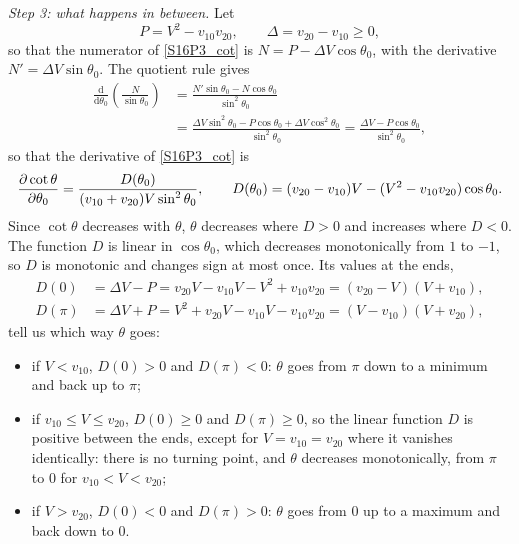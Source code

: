 \begin{problem}[title={Range of angles between two decay products}]
{\textit{Step 3: what happens in between.} Let
\begin{equation*}
    P = V^2-v_{10}v_{20}, \qquad \Delta = v_{20}-v_{10} \geq 0,
\end{equation*}
so that the numerator of \eqref{S16P3_cot} is $N = P - \Delta V\cos{\theta_0}$, with the derivative $N' = \Delta V\sin{\theta_0}$. The quotient rule gives
\begin{align*}
    \frac{\mathrm{d}}{\mathrm{d}\theta_0}\left(\frac{N}{\sin{\theta_0}}\right) &= \frac{N'\sin{\theta_0} - N\cos{\theta_0}}{\sin^2{\theta_0}} \\
    &= \frac{\Delta V\sin^2{\theta_0} - P\cos{\theta_0} + \Delta V\cos^2{\theta_0}}{\sin^2{\theta_0}} = \frac{\Delta V - P\cos{\theta_0}}{\sin^2{\theta_0}},
\end{align*}
so that the derivative of \eqref{S16P3_cot} is
\begin{equation*}
    \frac{\partial \cot{\theta}}{\partial \theta_0} = \frac{D(\theta_0)}{(v_{10}+v_{20})V\sin^2{\theta_0}}, \qquad
    D(\theta_0) = (v_{20}-v_{10})V - (V^2-v_{10}v_{20})\cos{\theta_0}.
\end{equation*}
Since $\cot{\theta}$ decreases with $\theta$, $\theta$ decreases where $D>0$ and increases where $D<0$. The function $D$ is linear in $\cos{\theta_0}$, which decreases monotonically from $1$ to $-1$, so $D$ is monotonic and changes sign at most once. Its values at the ends,
\begin{align*}
    D(0) &= \Delta V - P = v_{20}V - v_{10}V - V^2 + v_{10}v_{20} = (v_{20}-V)(V+v_{10}), \\
    D(\pi) &= \Delta V + P = V^2 + v_{20}V - v_{10}V - v_{10}v_{20} = (V-v_{10})(V+v_{20}),
\end{align*}
tell us which way $\theta$ goes:
\begin{itemize}
    \item if $V<v_{10}$, $D(0)>0$ and $D(\pi)<0$: $\theta$ goes from $\pi$ down to a minimum and back up to $\pi$;
    \item if $v_{10} \leq V \leq v_{20}$, $D(0) \geq 0$ and $D(\pi) \geq 0$, so the linear function $D$ is positive between the ends, except for $V = v_{10} = v_{20}$ where it vanishes identically: there is no turning point, and $\theta$ decreases monotonically, from $\pi$ to $0$ for $v_{10}<V<v_{20}$;
    \item if $V>v_{20}$, $D(0)<0$ and $D(\pi)>0$: $\theta$ goes from $0$ up to a maximum and back down to $0$.
\end{itemize}

}
\end{problem}
